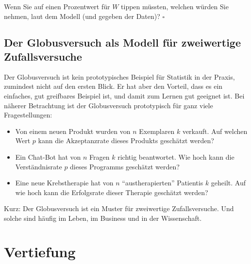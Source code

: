 \documentclass[
  ngerman,
  letterpaper,
  twoside,
  open=any]{scrbook}
\providecommand{\tightlist}{%
  \setlength{\itemsep}{0pt}\setlength{\parskip}{0pt}}\usepackage{longtable,booktabs,array}
\theoremstyle{definition}
\theoremstyle{plain}
\theoremstyle{definition}
\theoremstyle{definition}
\theoremstyle{definition}
\theoremstyle{definition}
\theoremstyle{remark}
\begin{document}
\begin{tcolorbox}[enhanced jigsaw, arc=.35mm, bottomrule=.15mm, bottomtitle=1mm, breakable, colback=white, colbacktitle=quarto-callout-tip-color!10!white, colframe=quarto-callout-tip-color-frame, coltitle=black, left=2mm, leftrule=.75mm, opacityback=0, opacitybacktitle=0.6, rightrule=.15mm, title=\textcolor{quarto-callout-tip-color}{\faLightbulb}\hspace{0.5em}{Tipp}, titlerule=0mm, toprule=.15mm, toptitle=1mm]

Wenn Sie auf einen Prozentwert für \(W\) tippen müssten, welchen würden
Sie nehmen, laut dem Modell (und gegeben der Daten)? \(\square\)

\end{tcolorbox}

\subsection{Der Globusversuch als Modell für zweiwertige
Zufallsversuche}\label{der-globusversuch-als-modell-fuxfcr-zweiwertige-zufallsversuche}

Der Globusversuch ist kein prototypisches Beispiel für Statistik in der
Praxis, zumindest nicht auf den ersten Blick. Er hat aber den Vorteil,
dass es ein einfaches, gut greifbares Beispiel ist, und damit zum Lernen
gut geeignet ist. Bei näherer Betrachtung ist der Globusversuch
prototypisch für ganz viele Fragestellungen:

\begin{itemize}
\tightlist
\item
  Von einem neuen Produkt wurden von \(n\) Exemplaren \(k\) verkauft.
  Auf welchen Wert \(p\) kann die Akzeptanzrate dieses Produkts
  geschätzt werden?
\item
  Ein Chat-Bot hat von \(n\) Fragen \(k\) richtig beantwortet. Wie hoch
  kann die Verständnisrate \(p\) dieses Programms geschätzt werden?
\item
  Eine neue Krebstherapie hat von \(n\) \enquote{austherapierten}
  Patientis \(k\) geheilt. Auf wie hoch kann die Erfolgsrate dieser
  Therapie geschätzt werden?
\end{itemize}

Kurz: Der Globusversuch ist ein Muster für zweiwertige Zufallsversuche.
Und solche sind häufig im Leben, im Business und in der Wissenschaft.

\section{Vertiefung}\label{vertiefung-2}
\end{document}

